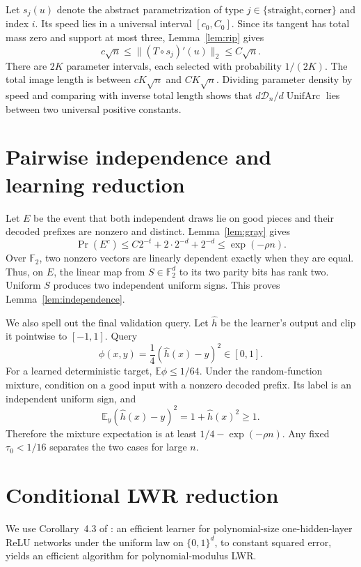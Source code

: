 \documentclass{article}
\theoremstyle{definition}
\theoremstyle{remark}
\newcommand{\Ftwo}{\mathbb F_2}
\newcommand{\cD}{\mathcal D}
\newcommand{\1}{\mathbf 1}
\begin{document}
Let $s_j(u)$ denote the abstract parametrization of type $j\in\{\mathrm{straight},\mathrm{corner}\}$ and index $i$. Its speed lies in a universal interval $[c_0,C_0]$. Since its tangent has total mass zero and support at most three, Lemma~\ref{lem:rip} gives \[ c\sqrt n\leq\|(T\circ s_j)'(u)\|_2\leq C\sqrt n. \] There are $2K$ parameter intervals, each selected with probability $1/(2K)$. The total image length is between $cK\sqrt n$ and $CK\sqrt n$. Dividing parameter density by speed and comparing with inverse total length shows that $d\cD_n/d\operatorname{UnifArc}$ lies between two universal positive constants.

\section{Pairwise independence and learning reduction}
\label{app:sq}

Let $E$ be the event that both independent draws lie on good pieces and their decoded prefixes are nonzero and distinct. Lemma~\ref{lem:gray} gives \[ \Pr(E^c)\leq C2^{-t}+2\cdot2^{-d}+2^{-d} \leq\exp(-\rho n). \] Over $\Ftwo$, two nonzero vectors are linearly dependent exactly when they are equal. Thus, on $E$, the linear map from $S\in\Ftwo^d$ to its two parity bits has rank two. Uniform $S$ produces two independent uniform signs. This proves Lemma~\ref{lem:independence}.

We also spell out the final validation query. Let $\widehat h$ be the learner's output and clip it pointwise to $[-1,1]$. Query \[ \phi(x,y)=\frac14(\widehat h(x)-y)^2\in[0,1]. \] For a learned deterministic target, $\mathbb E\phi\leq1/64$. Under the random-function mixture, condition on a good input with a nonzero decoded prefix. Its label is an independent uniform sign, and \[ \mathbb E_y(\widehat h(x)-y)^2=1+\widehat h(x)^2\geq1. \] Therefore the mixture expectation is at least $1/4-\exp(-\rho n)$. Any fixed $\tau_0<1/16$ separates the two cases for large $n$.

\section{Conditional LWR reduction}
\label{app:lwr}

We use Corollary~4.3 of \citet{chen2022noisefree}: an efficient learner for polynomial-size one-hidden-layer ReLU networks under the uniform law on $\{0,1\}^d$, to constant squared error, yields an efficient algorithm for polynomial-modulus LWR.
\end{document}
